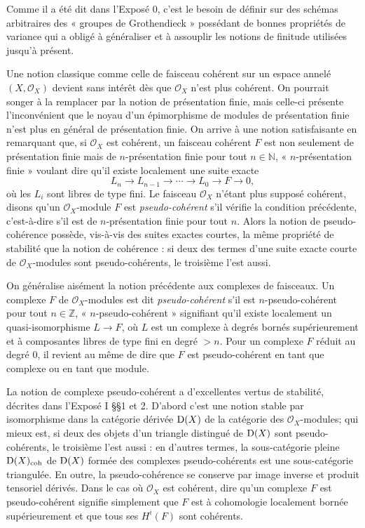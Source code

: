 \documentclass[11pt]{article}
\begin{document}
Comme il a été dit dans l'Exposé 0, c'est le besoin de définir sur des schémas arbitraires des « groupes de Grothendieck » possédant de bonnes propriétés de variance qui a obligé à généraliser et à assouplir les notions de finitude utilisées jusqu'à présent.

Une notion classique comme celle de faisceau cohérent sur un espace annelé \((X,\mathcal O_X)\) devient sans intérêt dès que \(\mathcal O_X\) n'est plus cohérent. On pourrait songer à la remplacer par la notion de présentation finie, mais celle-ci présente l'inconvénient que le noyau d'un épimorphisme de modules de présentation finie n'est plus en général de présentation finie. On arrive à une notion satisfaisante en remarquant que, si \(\mathcal O_X\) est cohérent, un faisceau cohérent \(F\) est non seulement de présentation finie mais de \(n\)-présentation finie pour tout \(n\in\mathbb N\), « \(n\)-présentation finie » voulant dire qu'il existe localement une suite exacte
\[
  L_n\longrightarrow L_{n-1}\longrightarrow \cdots \longrightarrow L_0\longrightarrow F\longrightarrow 0,
\]
où les \(L_i\) sont libres de type fini. Le faisceau \(\mathcal O_X\) n'étant plus supposé cohérent, disons qu'un \(\mathcal O_X\)-module \(F\) est \emph{pseudo-cohérent} s'il vérifie la condition précédente, c'est-à-dire s'il est de \(n\)-présentation finie pour tout \(n\). Alors la notion de pseudo-cohérence possède, vis-à-vis des suites exactes courtes, la même propriété de stabilité que la notion de cohérence : si deux des termes d'une suite exacte courte de \(\mathcal O_X\)-modules sont pseudo-cohérents, le troisième l'est aussi.

On généralise aisément la notion précédente aux complexes de faisceaux. Un complexe \(F\) de \(\mathcal O_X\)-modules est dit \emph{pseudo-cohérent} s'il est \(n\)-pseudo-cohérent pour tout \(n\in\mathbb Z\), « \(n\)-pseudo-cohérent » signifiant qu'il existe localement un quasi-isomorphisme \(L\to F\), où \(L\) est un complexe à degrés bornés supérieurement et à composantes libres de type fini en degré \(>n\). Pour un complexe \(F\) réduit au degré \(0\), il revient au même de dire que \(F\) est pseudo-cohérent en tant que complexe ou en tant que module.

La notion de complexe pseudo-cohérent a d'excellentes vertus de stabilité, décrites dans l'Exposé I §§1 et 2. D'abord c'est une notion stable par isomorphisme dans la catégorie dérivée \(\mathrm D(X)\) de la catégorie des \(\mathcal O_X\)-modules; qui mieux est, si deux des objets d'un triangle distingué de \(\mathrm D(X)\) sont pseudo-cohérents, le troisième l'est aussi : en d'autres termes, la sous-catégorie pleine \(\mathrm D(X)_{\mathrm{coh}}\) de \(\mathrm D(X)\) formée des complexes pseudo-cohérents est une sous-catégorie triangulée. En outre, la pseudo-cohérence se conserve par image inverse et produit tensoriel dérivés. Dans le cas où \(\mathcal O_X\) est cohérent, dire qu'un complexe \(F\) est pseudo-cohérent signifie simplement que \(F\) est à cohomologie localement bornée supérieurement et que tous ses \(H^i(F)\) sont cohérents.
\end{document}
